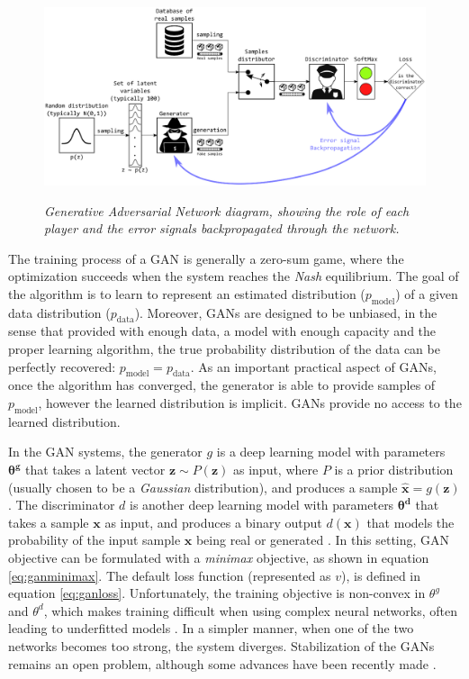 \begin{figure}[!htb]
	\centering
	\includegraphics[width=1\textwidth]{chapter2/images/police_counterfeiter.eps}
	\label{fig:police_counterfeiter}
	\caption{\textit{Generative Adversarial Network diagram, showing the role of each player and the error signals backpropagated through the network.} }
\end{figure}

The training process of a GAN is generally a zero-sum game, where the optimization succeeds when the system reaches the \textit{Nash} equilibrium. The goal of the algorithm is to learn to represent an estimated distribution ($p_{\mathrm{model}}$) of a given data distribution ($p_{\mathrm{data}}$). Moreover, GANs are designed to be unbiased, in the sense that provided with enough data, a model with enough capacity and the proper learning algorithm, the true probability distribution of the data can be perfectly recovered: $p_{\mathrm{model}} = p_{\mathrm{data}}$. As an important practical aspect of GANs, once the algorithm has converged, the generator is able to provide samples of $p_\mathrm{model}$, however the learned distribution is implicit. GANs provide no access to the learned distribution. 

In the GAN systems, the generator $g$ is a deep learning model with parameters $\mathbf{\theta^g}$ that takes a latent vector $\mathbf{z} \sim P(\mathbf{z})$ as input, where $P$ is a prior distribution (usually chosen to be a \textit{Gaussian} distribution), and produces a sample $\hat{\mathbf{x}}=g(\mathbf{z})$. The discriminator $d$ is another deep learning model with parameters $\mathbf{\theta^d}$ that takes a sample $\mathbf{x}$ as input, and produces a binary output $d(\mathbf{x})$ that models the probability of the input sample $\mathbf{x}$ being real or generated \cite{Goodfellow2014}. In this setting, GAN objective can be formulated with a \textit{minimax} objective, as shown in equation \ref{eq:ganminimax}. The default loss function (represented as $v$), is defined in equation \ref{eq:ganloss}. Unfortunately, the training objective is non-convex in $\theta^g$ and $\theta^d$, which makes training difficult when using complex neural networks, often leading to underfitted models \cite{Goodfellow2016b,Goodfellow2016}. In a simpler manner, when one of the two networks becomes too strong, the system diverges. Stabilization of the GANs remains an open problem, although some advances have been recently made \cite{arjovsky2017, shaobo2017, wang2022}.

